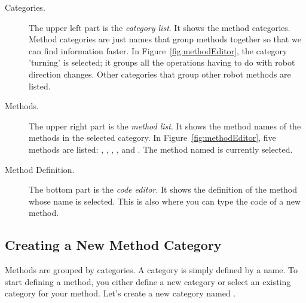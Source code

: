 \begin{description}
\item[Categories.] The \newcommand{\replace}[2]{left top}{upper left} part is the \emph{category list}.
It \newcommand{\replace}[2]{contains}{shows} the method categories. Method categories are just names
that \newcommand{\remove}[1]{help us to} group methods together so that we can find information
faster. In Figure~\ref{fig:methodEditor}, the category 'turning'
\newcommand{\replace}[2]{grouping}{is selected; it groups} all the operations having to \newcommand{\replace}[2]{deal}{do} with robot direction changes\newcommand{\remove}[1]{ is selected}. Other categories \newcommand{\replace}[2]{grouping}{that group} other robot \newcommand{\replace}[2]{behavior}{methods} are \newcommand{\add}[1]{also} listed.
\item[Methods.] The \newcommand{\replace}[2]{right top}{upper right} part is the \emph{method list}.
It \newcommand{\replace}[2]{contains}{shows} the method names of the methods \newcommand{\remove}[1]{contained} in the selected category. In Figure~\ref{fig:methodEditor}, five  methods are listed: , \newcommand{\replace}[2]{ and}{,} \turnLeft, \turnRight, and . The method named  is currently selected.
\item[Method Definition.] The bottom part is the \emph{code \newcommand{\add}[1]{display and code} editor}. It shows the definition of the method whose name is selected. This is also \newcommand{\remove}[1]{the place} where you can type the code of a new method.
\end{description}

\subsection{Creating a New Method Category}\label{sec:createCategory} 
Methods are grouped by categories. A category is simply defined by a name. To start defining a method, you \newcommand{\replace}[2]{must first}{either} define \newcommand{\replace}[2]{its}{a new} category \newcommand{\add}[1]{for it,} or select \newcommand{\replace}[2]{a}{an existing} category \newcommand{\replace}[2]{in which you want to define}{for} your method. \newcommand{\replace}[2]{Let us}{Let's} create a new category named \newcommand{\replace}[2]{regular shapes}{}.

